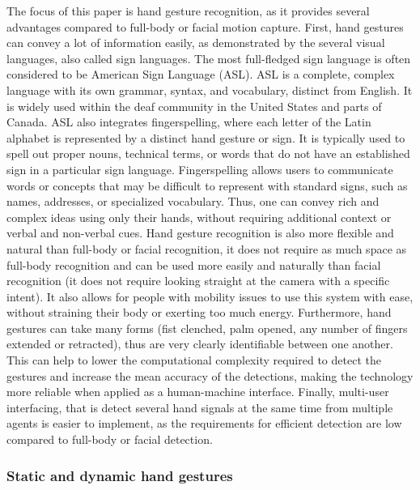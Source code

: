 \documentclass[12pt]{article}
\begin{document}
The focus of this paper is hand gesture recognition, as it provides several advantages compared to full-body or facial motion capture. First, hand gestures can convey a lot of information easily, as demonstrated by the several visual languages, also called sign languages. The most full-fledged sign language is often considered to be American Sign Language (ASL). ASL is a complete, complex language with its own grammar, syntax, and vocabulary, distinct from English. It is widely used within the deaf community in the United States and parts of Canada.
ASL also integrates fingerspelling, where each letter of the Latin alphabet is represented by a distinct hand gesture or sign. It is typically used to spell out proper nouns, technical terms, or words that do not have an established sign in a particular sign language. Fingerspelling allows users to communicate words or concepts that may be difficult to represent with standard signs, such as names, addresses, or specialized vocabulary. Thus, one can convey rich and complex ideas using only their hands, without requiring additional context or verbal and non-verbal cues.
Hand gesture recognition is also more flexible and natural than full-body or facial recognition, it does not require as much space as full-body recognition and can be used more easily and naturally than facial recognition (it does not require looking straight at the camera with a specific intent). It also allows for people with mobility issues to use this system with ease, without straining their body or exerting too much energy.
Furthermore, hand gestures can take many forms (fist clenched, palm opened, any number of fingers extended or retracted), thus are very clearly identifiable between one another. This can help to lower the computational complexity required to detect the gestures and increase the mean accuracy of the detections, making the technology more reliable when applied as a human-machine interface. Finally, multi-user interfacing, that is detect several hand signals at the same time from multiple agents is easier to implement, as the requirements for efficient detection are low compared to full-body or facial detection. 

\subsubsection{Static and dynamic hand gestures}
\end{document}
